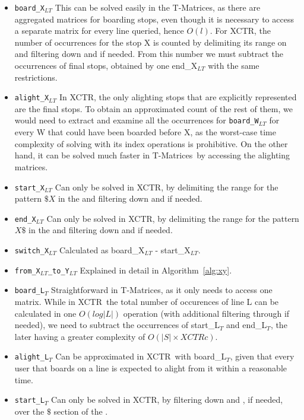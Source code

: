 \documentclass[runningheads]{llncs}
\newcommand{\acumm}{T-Matrices} %
\newcommand{\ctr}{XCTR}
\newcommand{\ctrq}{XCTRc}
\begin{document}
\begin{itemize}
    \item \texttt{board\_X$_{LT}$} This can be solved easily in the \acumm, as there are aggregated matrices for boarding stops, even though it is necessary to access a separate matrix for every line queried, hence $O(l)$. For \ctr, the number of occurrences for the stop X is counted by delimiting its range on  and filtering down  and  if needed. From this number we must subtract the occurrences of final stops, obtained by one end\_X$_{LT}$ with the same restrictions.
    \item \texttt{alight\_X$_{LT}$} In \ctr, the only alighting stops that are explicitly represented are the final stops. To obtain an approximated count of the rest of them, we would need to extract and examine all the occurrences for \texttt{board\_W$_{LT}$} for every W that could have been boarded before X, as the worst-case time complexity of solving with its index operations is prohibitive. On the other hand, it can be solved much faster in \acumm~by accessing the alighting matrices.
    \item \texttt{start\_X$_{LT}$} Can only be solved in \ctr, by delimiting the range for the pattern $\$X$ in the  and filtering down  and  if needed.
    \item \texttt{end\_X$_{LT}$} Can only be solved in \ctr, by delimiting the range for the pattern $X\$$ in the  and filtering down  and  if needed.
    \item \texttt{switch\_X$_{LT}$} Calculated as board\_X$_{LT}$ - start\_X$_{LT}$.
    \item \texttt{from\_X$_{LT}$\_to\_Y$_{LT}$} Explained in detail in Algorithm~\ref{alg:xy}.
    \item \texttt{board\_L$_T$} Straightforward in \acumm, as it only needs to access one matrix. While in \ctr~the total number of occurences of line L can be calculated in one $O(log|L|)$ operation (with additional filtering through  if needed), we need to subtract the occurrences of start\_L$_T$ and end\_L$_T$, the later having a greater complexity of $O(|S| \times \ctrq)$.
    \item \texttt{alight\_L$_T$} Can be approximated in \ctr~with board\_L$_T$, given that every user that boards on a line is expected to alight from it within a reasonable time.
    \item \texttt{start\_L$_T$} Can only be solved in \ctr, by filtering down  and , if needed, over the $\$$ section of the .

\end{itemize}
\end{document}
